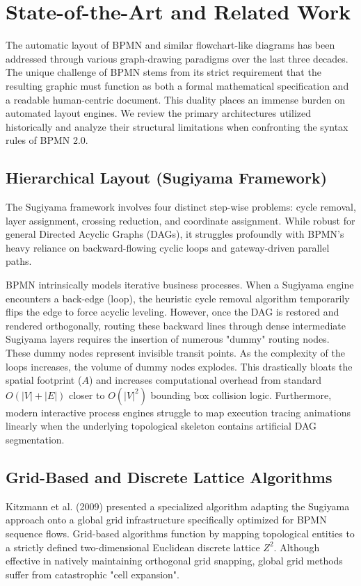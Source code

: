\documentclass[fleqn,10pt]{wlscirep}
\begin{document}
\section*{State-of-the-Art and Related Work}
The automatic layout of BPMN and similar flowchart-like diagrams has been addressed through various graph-drawing paradigms over the last three decades. The unique challenge of BPMN stems from its strict requirement that the resulting graphic must function as both a formal mathematical specification and a readable human-centric document. This duality places an immense burden on automated layout engines. We review the primary architectures utilized historically and analyze their structural limitations when confronting the syntax rules of BPMN 2.0.

\subsection*{Hierarchical Layout (Sugiyama Framework)}
The Sugiyama framework \cite{Sugiyama1981} involves four distinct step-wise problems: cycle removal, layer assignment, crossing reduction, and coordinate assignment. While robust for general Directed Acyclic Graphs (DAGs), it struggles profoundly with BPMN's heavy reliance on backward-flowing cyclic loops and gateway-driven parallel paths. 

BPMN intrinsically models iterative business processes. When a Sugiyama engine encounters a back-edge (loop), the heuristic cycle removal algorithm temporarily flips the edge to force acyclic leveling. However, once the DAG is restored and rendered orthogonally, routing these backward lines through dense intermediate Sugiyama layers requires the insertion of numerous "dummy" routing nodes. These dummy nodes represent invisible transit points. As the complexity of the loops increases, the volume of dummy nodes explodes. This drastically bloats the spatial footprint ($A$) and increases computational overhead from standard $O(|V| + |E|)$ closer to $O(|V|^2)$ bounding box collision logic. Furthermore, modern interactive process engines struggle to map execution tracing animations linearly when the underlying topological skeleton contains artificial DAG segmentation.

\subsection*{Grid-Based and Discrete Lattice Algorithms}
Kitzmann et al. (2009) \cite{Kitzmann2009} presented a specialized algorithm adapting the Sugiyama approach onto a global grid infrastructure specifically optimized for BPMN sequence flows. Grid-based algorithms function by mapping topological entities to a strictly defined two-dimensional Euclidean discrete lattice $Z^2$. Although effective in natively maintaining orthogonal grid snapping, global grid methods suffer from catastrophic "cell expansion". 
\end{document}
